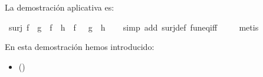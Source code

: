 \begin{isabellebody}
\begin{isamarkuptext}
La demostración aplicativa es:%
\end{isamarkuptext}\isamarkuptrue%
\isamarkupfalse%
\ {\isachardoublequoteopen}surj\ f\ {\isasymLongrightarrow}\ {\isacharparenleft}{\isacharparenleft}g\ {\isasymcirc}\ f{\isacharparenright}\ {\isacharequal}\ {\isacharparenleft}h\ {\isasymcirc}\ f{\isacharparenright}\ {\isacharparenright}\ {\isacharequal}\ {\isacharparenleft}g\ {\isacharequal}\ h{\isacharparenright}{\isachardoublequoteclose}\isanewline
%
\isadelimproof
\ \ %
\endisadelimproof
%
\isatagproof
{}\isamarkupfalse%
\ {\isacharparenleft}simp\ add{\isacharcolon}\ surj{\isacharunderscore}def\ fun{\isacharunderscore}eq{\isacharunderscore}iff{\isacharparenright}\isanewline
\ \ \isamarkupfalse%
\ \ metis\isanewline
\ \ \isamarkupfalse%
%
\endisatagproof
{\isafoldproof}%
%
\isadelimproof
%
\endisadelimproof
%
\begin{isamarkuptext}%
En esta demostración hemos introducido:
 \begin{itemize}
    \item[]  
      \hfill ()
  \end{itemize}%
\end{isamarkuptext}\isamarkuptrue%
%
\isadelimtheory
%
\endisadelimtheory
%
\isatagtheory
%
\endisatagtheory
{\isafoldtheory}%
%
\isadelimtheory
%
\endisadelimtheory
%
\end{isabellebody}%
\endinput
